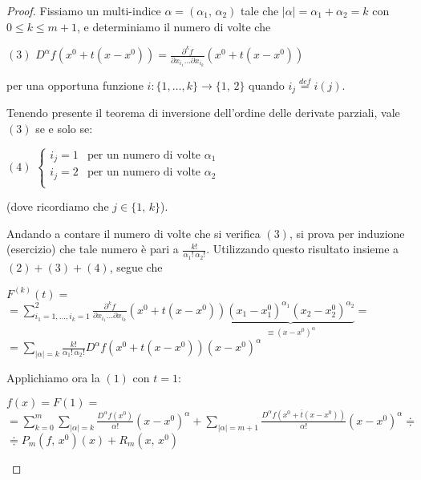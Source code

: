 \begin{proof}
Fissiamo un multi-indice $\alpha = (\alpha_1,\,\alpha_2)$ tale che $|\alpha| = \alpha_1+\alpha_2 = k$ con $0 \leq k \leq m+1$, e determiniamo il numero di volte che
\begin{center}
$\mathrm{(3)}$
\hfill
$\displaystyle D^{\alpha} f (x^0 + t(x-x^0)) = \frac{\partial^k f}{\partial x_{i_1} \ldots \partial x_{i_k}} (x^0 + t(x-x^0))$
\hfill \null \\
\end{center}
per una opportuna funzione $i : \lbrace 1, \ldots ,k \rbrace \longrightarrow \lbrace 1,\,2 \rbrace$ quando $i_j \overset{def}{=} i(j)$.

Tenendo presente il teorema di inversione dell'ordine delle derivate parziali, vale $\mathrm{(3)}$ se e solo se:
\begin{center}
$\mathrm{(4)}$
\hfill
$\displaystyle 
\begin{cases}
i_j = 1 & \text{per un numero di volte $\alpha_1$}\\
i_j = 2 & \text{per un numero di volte $\alpha_2$}\\
\end{cases}
$
\hfill \null \\
\end{center}
(dove ricordiamo che $j \in \lbrace 1,\,k \rbrace$).

Andando a contare il numero di volte che si verifica $\mathrm{(3)}$, si prova per induzione (esercizio) che tale numero è pari a $\displaystyle \frac{k!}{\alpha_1!\, \alpha_2!}$. Utilizzando questo risultato insieme a $(2)+(3)+(4)$, segue che
\begin{flushleft}
$\displaystyle F^{(k)}(t) =$\\
$\displaystyle = \sum_{i_1=1,\ldots,i_k=1}^2
\frac{\partial^k f}{\partial x_{i_1} \ldots \partial x_{i_k}}(x^0+t(x-x^0))
\underbrace{(x_1-x_1^0)^{\alpha_1} (x_2-x_2^0)^{\alpha_2}}_{\equiv (x-x^0)^{\alpha}}=$\\
$\displaystyle = \sum_{|\alpha|=k}
\frac{k!}{\alpha_1!\, \alpha_2!} D^{\alpha}f(x^0+t(x-x^0))
(x-x^0)^{\alpha}$
\end{flushleft}
Applichiamo ora la $\mathrm{(1)}$ con $t=1$:
\begin{flushleft}
$\displaystyle f(x) = F(1) =$\\
$\displaystyle = \sum_{k=0}^m \sum_{|\alpha|=k} \frac{D^{\alpha}f(x^0)}{\alpha!}(x-x^0)^{\alpha} + \sum_{|\alpha|=m+1} \frac{D^{\alpha}f(x^0+\overline{t}(x-x^0))}{\alpha!}(x-x^0)^{\alpha} \doteqdot $\\
$\displaystyle \doteqdot P_m(f,\,x^0)(x) + R_m(x,\,x^0)$
\end{flushleft}
\end{proof}

